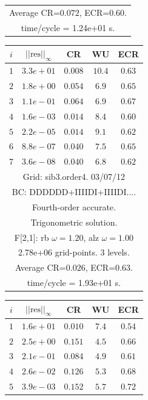 \begin{table}[hbt]
\begin{center}
{\begin{tabular}{|c|c|c|c|c|}
\multicolumn{5}{|c|}{Average CR=$0.072$, ECR=$0.60$.}  \\
\multicolumn{5}{|c|}{time/cycle = 1.24e+01 s.}  \\
\hline 
\end{tabular}
\begin{tabular}{|c|c|c|c|c|} \hline 
 $i$   & $\vert\vert\mbox{res}\vert\vert_\infty$  &  CR     &  WU    & ECR  \\   \hline 
 $ 1$  & $ 3.3e+01$ & $0.008$ & $10.4$ & $0.63$ \\ 
 $ 2$  & $ 1.8e+00$ & $0.054$ & $ 6.9$ & $0.65$ \\ 
 $ 3$  & $ 1.1e-01$ & $0.064$ & $ 6.9$ & $0.67$ \\ 
 $ 4$  & $ 1.6e-03$ & $0.014$ & $ 8.4$ & $0.60$ \\ 
 $ 5$  & $ 2.2e-05$ & $0.014$ & $ 9.1$ & $0.62$ \\ 
 $ 6$  & $ 8.8e-07$ & $0.040$ & $ 7.5$ & $0.65$ \\ 
 $ 7$  & $ 3.6e-08$ & $0.040$ & $ 6.8$ & $0.62$ \\ 
\hline 
\multicolumn{5}{|c|}{Grid: sib3.order4. 03/07/12}  \\
\multicolumn{5}{|c|}{BC: DDDDDD+IIIIDI+IIIIDI....}  \\
\multicolumn{5}{|c|}{Fourth-order accurate.}  \\
\multicolumn{5}{|c|}{Trigonometric solution.}  \\
\multicolumn{5}{|c|}{F[2,1]: rb $\omega=1.20$, alz $\omega=1.00$}  \\
\multicolumn{5}{|c|}{2.78e+06 grid-points. 3 levels.}  \\
\multicolumn{5}{|c|}{Average CR=$0.026$, ECR=$0.63$.}  \\
\multicolumn{5}{|c|}{time/cycle = 1.93e+01 s.}  \\
\hline 
\end{tabular}
\begin{tabular}{|c|c|c|c|c|} \hline 
 $i$   & $\vert\vert\mbox{res}\vert\vert_\infty$  &  CR     &  WU    & ECR  \\   \hline 
 $ 1$  & $ 1.6e+01$ & $0.010$ & $ 7.4$ & $0.54$ \\ 
 $ 2$  & $ 2.5e+00$ & $0.151$ & $ 4.5$ & $0.66$ \\ 
 $ 3$  & $ 2.1e-01$ & $0.084$ & $ 4.9$ & $0.61$ \\ 
 $ 4$  & $ 2.6e-02$ & $0.126$ & $ 5.3$ & $0.68$ \\ 
 $ 5$  & $ 3.9e-03$ & $0.152$ & $ 5.7$ & $0.72$ \\ 

\end{tabular}}
\end{center}
\end{table}
